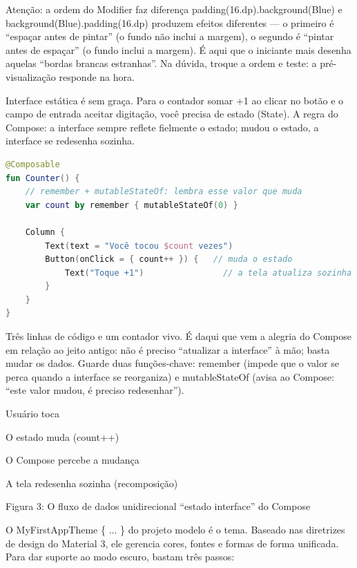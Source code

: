 \begin{tcbwarn}{Atenção: a ordem do Modifier faz diferença}
padding(16.dp).background(Blue) e background(Blue).padding(16.dp) produzem efeitos diferentes — o primeiro é “espaçar antes de pintar” (o fundo não inclui a margem), o segundo é “pintar antes de espaçar” (o fundo inclui a margem). É aqui que o iniciante mais desenha aquelas “bordas brancas estranhas”. Na dúvida, troque a ordem e teste: a pré-visualização responde na hora.

\end{tcbwarn}


Interface estática é sem graça. Para o contador somar +1 ao clicar no botão e o campo de entrada aceitar digitação, você precisa de estado (State). A regra do Compose: a interface sempre reflete fielmente o estado; mudou o estado, a interface se redesenha sozinha.

\begin{lstlisting}[language=Kotlin]
@Composable
fun Counter() {
    // remember + mutableStateOf: lembra esse valor que muda
    var count by remember { mutableStateOf(0) }

    Column {
        Text(text = "Você tocou $count vezes")
        Button(onClick = { count++ }) {   // muda o estado
            Text("Toque +1")                // a tela atualiza sozinha
        }
    }
}
\end{lstlisting}

Três linhas de código e um contador vivo. É daqui que vem a alegria do Compose em relação ao jeito antigo: não é preciso “atualizar a interface” à mão; basta mudar os dados. Guarde duas funções-chave: remember (impede que o valor se perca quando a interface se reorganiza) e mutableStateOf (avisa ao Compose: “este valor mudou, é preciso redesenhar”).

Usuário toca

O estado muda (count++)

O Compose percebe a mudança

A tela redesenha sozinha (recomposição)

\begin{center}\small\color{gray}Figura 3: O fluxo de dados unidirecional “estado interface” do Compose\end{center}


O MyFirstAppTheme \{ ... \} do projeto modelo é o tema. Baseado nas diretrizes de design do Material 3, ele gerencia cores, fontes e formas de forma unificada. Para dar suporte ao modo escuro, bastam três passos:

